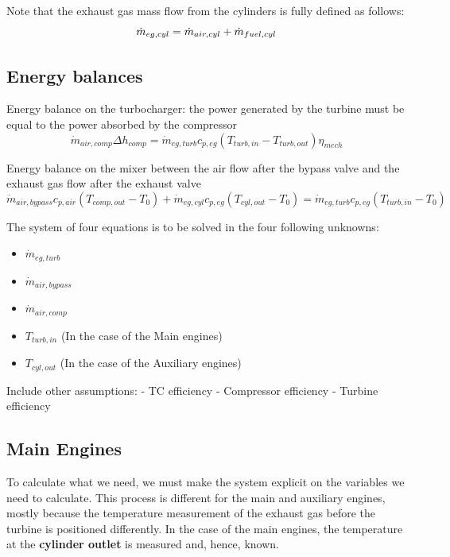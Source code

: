 \documentclass[preprint,12pt]{elsarticle}
\begin{document}
Note that the exhaust gas mass flow from the cylinders is fully defined as follows:
\begin{equation}
\dot{m}_{eg,cyl} = \dot{m}_{air,cyl} + \dot{m}_{fuel,cyl} \\
\end{equation}

\subsection{Energy balances}

Energy balance on the turbocharger: the power generated by the turbine must be equal to the power absorbed by the compressor
\begin{equation}
\dot{m}_{air,comp} \Delta h_{comp} = \dot{m}_{eg,turb} c_{p,eg} (T_{turb,in} - T_{turb,out}) \eta_{mech}
\end{equation}

Energy balance on the mixer between the air flow after the bypass valve and the exhaust gas flow after the exhaust valve
\begin{equation}
\dot{m}_{air,bypass} c_{p,air} (T_{comp,out} - T_0) + \dot{m}_{eg,cyl} c_{p,eg}  (T_{cyl,out} - T_0) = \dot{m}_{eg,turb} c_{p,eg} (T_{turb,in} - T_0)
\end{equation}


The system of four equations is to be solved in the four following unknowns:
\begin{itemize}
	\item $ \dot{m}_{eg,turb} $
	\item $ \dot{m}_{air,bypass} $
	\item $ \dot{m}_{air,comp} $
	\item $ T_{turb,in} $ (In the case of the Main engines)
	\item $ T_{cyl,out} $ (In the case of the Auxiliary engines)
\end{itemize}

Include other assumptions:
- TC efficiency
- Compressor efficiency
- Turbine efficiency


\subsection{Main Engines}

To calculate what we need, we must make the system explicit on the variables we need to calculate. This process is different for the main and auxiliary engines, mostly because the temperature measurement of the exhaust gas before the turbine is positioned differently. In the case of the main engines, the temperature at the \textbf{cylinder outlet} is measured and, hence, known. 
\end{document}
